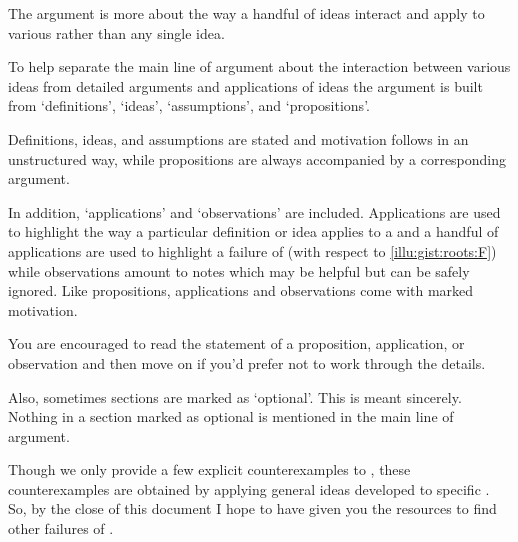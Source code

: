 \begin{note}
  The argument is more about the way a handful of ideas interact and apply to various  rather than any single idea.

  To help separate the main line of argument about the interaction between various ideas from detailed arguments and applications of ideas the argument is built from `definitions', `ideas', `assumptions', and `propositions'.

  Definitions, ideas, and assumptions are stated and motivation follows in an unstructured way, while propositions are always accompanied by a corresponding argument.

  In addition, `applications' and `observations' are included.
  Applications are used to highlight the way a particular definition or idea applies to a \scen{} and a handful of applications are used to highlight a failure of \issueInclusion{} (with respect to \autoref{illu:gist:roots:F}) while observations amount to notes which may be helpful but can be safely ignored.
  Like propositions, applications and observations come with marked motivation.

  You are encouraged to read the statement of a proposition, application, or observation and then move on if you'd prefer not to work through the details.

  Also, sometimes sections are marked as `optional'.
  This is meant sincerely.
  Nothing in a section marked as optional is mentioned in the main line of argument.
\end{note}

\begin{note}
  Though we only provide a few explicit counterexamples to \issueInclusion{}, these counterexamples are obtained by applying general ideas developed to specific .
  So, by the close of this document I hope to have given you the resources to find other failures of \issueInclusion{}.
\end{note}



